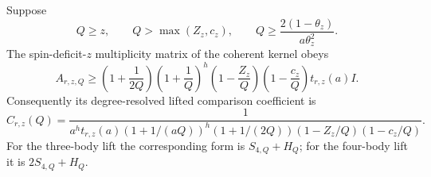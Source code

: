 \begin{lemma}\label{lem:opt-coh}
Suppose
\begin{equation}\label{eq:opt-coh-domain}
 Q\ge z,\qquad Q>\max(Z_z,c_z),\qquad
 Q\ge\frac{2(1-\theta_z)}{a\theta_z^2}.
\end{equation}
The spin-deficit-$z$ multiplicity matrix of the coherent kernel obeys
\begin{equation}\label{eq:opt-coh-block-lower}
 A_{r,z,Q}\ge
 \left(1+\frac1{2Q}\right)\left(1+\frac1Q\right)^h
 \left(1-\frac{Z_z}Q\right)\left(1-\frac{c_z}Q\right)t_{r,z}(a)I.
\end{equation}
Consequently its degree-resolved lifted comparison coefficient is
\begin{equation}\label{eq:opt-coh-coefficient}
 C_{r,z}(Q)=
 \frac1{a^ht_{r,z}(a)(1+1/(aQ))^h(1+1/(2Q))
                 (1-Z_z/Q)(1-c_z/Q)}.
\end{equation}
For the three-body lift the corresponding form is $S_{4,Q}+H_Q$;
for the four-body lift it is $2S_{4,Q}+H_Q$.
\end{lemma}
